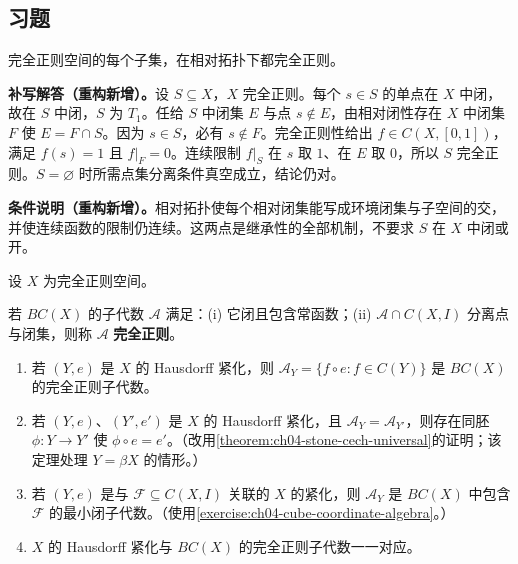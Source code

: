 \documentclass[../../main.tex]{subfiles}
\begin{document}
\subsection*{习题}
\begin{exercise}\label{exercise:ch04-completely-regular-subspace}
完全正则空间的每个子集，在相对拓扑下都完全正则。
\end{exercise}
\begin{solution}
\textbf{补写解答（重构新增）。}设 $S\subseteq X$，$X$ 完全正则。每个 $s\in S$ 的单点在 $X$ 中闭，故在 $S$ 中闭，$S$ 为 $T_1$。任给 $S$ 中闭集 $E$ 与点 $s\notin E$，由相对闭性存在 $X$ 中闭集 $F$ 使 $E=F\cap S$。因为 $s\in S$，必有 $s\notin F$。完全正则性给出 $f\in C(X,[0,1])$，满足 $f(s)=1$ 且 $f|_F=0$。连续限制 $f|_S$ 在 $s$ 取 $1$、在 $E$ 取 $0$，所以 $S$ 完全正则。$S=\varnothing$ 时所需点集分离条件真空成立，结论仍对。
\end{solution}
\begin{remark}
\textbf{条件说明（重构新增）。}相对拓扑使每个相对闭集能写成环境闭集与子空间的交，并使连续函数的限制仍连续。这两点是继承性的全部机制，不要求 $S$ 在 $X$ 中闭或开。
\end{remark}
\begin{exercise}\label{exercise:ch04-compactification-algebras}
设 $X$ 为完全正则空间。
\begin{definition*}[完全正则子代数]\label{definition:ch04-completely-regular-algebra}
若 $BC(X)$ 的子代数 $\mathcal A$ 满足：\textup{(i)} 它闭且包含常函数；\textup{(ii)} $\mathcal A\cap C(X,I)$ 分离点与闭集，则称 $\mathcal A$ \textbf{完全正则}。
\end{definition*}
\begin{enumerate}
\item\label{item:ch04-compactification-algebra-regular} 若 $(Y,e)$ 是 $X$ 的 Hausdorff 紧化，则 $\mathcal A_Y=\{f\circ e:f\in C(Y)\}$ 是 $BC(X)$ 的完全正则子代数。
\item\label{item:ch04-compactification-algebra-unique} 若 $(Y,e)$、$(Y',e')$ 是 $X$ 的 Hausdorff 紧化，且 $\mathcal A_Y=\mathcal A_{Y'}$，则存在同胚 $\phi:Y\to Y'$ 使 $\phi\circ e=e'$。（改用\cref{theorem:ch04-stone-cech-universal}的证明；该定理处理 $Y=\beta X$ 的情形。）
\item\label{item:ch04-compactification-generated-algebra} 若 $(Y,e)$ 是与 $\mathcal F\subseteq C(X,I)$ 关联的 $X$ 的紧化，则 $\mathcal A_Y$ 是 $BC(X)$ 中包含 $\mathcal F$ 的最小闭子代数。（使用\cref{exercise:ch04-cube-coordinate-algebra}。）
\item\label{item:ch04-compactification-algebra-correspondence} $X$ 的 Hausdorff 紧化与 $BC(X)$ 的完全正则子代数一一对应。
\end{enumerate}
\end{exercise}
\end{document}
